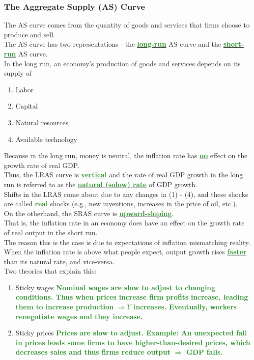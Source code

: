\documentclass[11pt]{article}\usepackage[]{graphicx}\usepackage[]{color}
\theoremstyle{definition}
\newcommand{\ddp}[1]{{\textbf{\textcolor{ForestGreen}{#1}}}}
\newcommand{\dd}[1]{{\underline{\textbf{\textcolor{ForestGreen}{#1}}}}}
\begin{document}
\subsubsection*{The Aggregate Supply (AS) Curve}

The AS curve comes from the quantity of goods and services that firms choose to produce and sell.
\\

The AS curve has two representations - the \dd{long-run} AS curve and the \dd{short-run} AS curve. 
\\

In the long run, an economy's production of goods and services depends on  its supply of
\begin{enumerate}
	\item Labor
	\item Capital
	\item Natural resources
	\item Available technology
\end{enumerate}

Because in the long run, money is neutral, the inflation rate has \dd{no} effect on the growth rate of real GDP. 
\\

Thus, the LRAS curve is \dd{vertical} and the rate of real GDP growth in the long run is referred to as the \dd{natural (solow) rate} of GDP growth.
\\

Shifts in the LRAS come about due to any changes in (1) - (4), and these shocks are called \dd{real} shocks (e.g., new inventions, increases in the price of oil, etc.).
\\

On the otherhand, the SRAS curve is \dd{upward-sloping}. 
\\

That is, the inflation rate in an economy does have an effect on the growth rate of real output in the short run.
\\

The reason this is the case is due to expectations of inflation mismatching reality. When the inflation rate is above what people expect, output growth rises \dd{faster} than its natural rate, and vice-versa. 
\\

Two theories that explain this:
\begin{enumerate}
	\setlength{\itemsep}{1em}
	\item Sticky wages \ddp{Nominal wages are slow to adjust to changing conditions. Thus when prices increase firm profits increase, leading them to increase production $\Rightarrow Y$ increases. Eventually, workers renegotiate wages and they increase.}
	\item Sticky prices \ddp{Prices are slow to adjust. Example: An unexpected fall in prices leads some firms to have higher-than-desired prices, which decreases sales and thus firms reduce output $\Rightarrow$ GDP falls.}
\end{enumerate}
\end{document}
